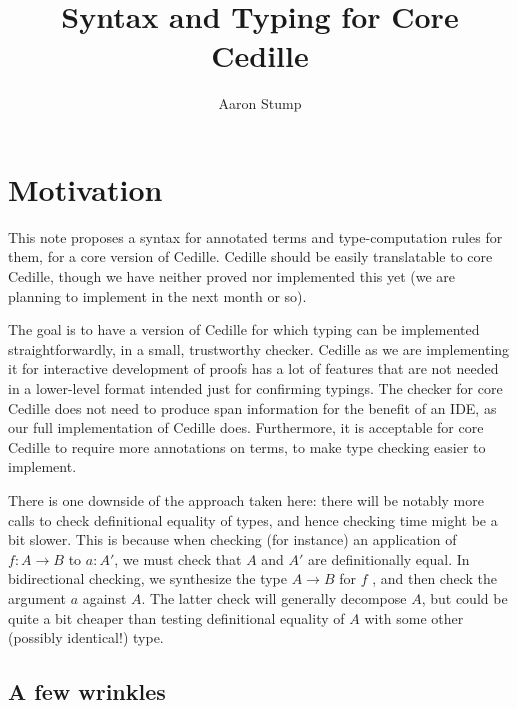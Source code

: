 \documentclass{article}
\begin{document}
\newcommand{\interp}[1]{\llbracket #1 \rrbracket} 
\newtheorem{theorem}{Theorem}
\newtheorem{lemma}[theorem]{Lemma}
\newtheorem{definition}[theorem]{Definition}
\newtheorem{corollary}[theorem]{Corollary}

\title{Syntax and Typing for Core Cedille}

\author{Aaron Stump}

\maketitle

\section{Motivation}

This note proposes a syntax for annotated terms and type-computation
rules for them, for a core version of Cedille.  Cedille should be
easily translatable to core Cedille, though we have neither proved nor
implemented this yet (we are planning to implement in the next
month or so).

The goal is to have a version of Cedille for which typing can be
implemented straightforwardly, in a small, trustworthy checker.
Cedille as we are implementing it for interactive development of
proofs has a lot of features that are not needed in a lower-level
format intended just for confirming typings.  The checker for core
Cedille does not need to produce span information for the benefit of
an IDE, as our full implementation of Cedille does.  Furthermore, it
is acceptable for core Cedille to require more annotations on terms,
to make type checking easier to implement.

There is one downside of the approach taken here: there will be
notably more calls to check definitional equality of types, and hence
checking time might be a bit slower.  This is because when checking
(for instance) an application of $f : A \to B$ to $a : A'$, we must
check that $A$ and $A'$ are definitionally equal.  In bidirectional
checking, we synthesize the type $A \to B$ for $f$ , and then check
the argument $a$ against $A$.  The latter check will generally
decompose $A$, but could be quite a bit cheaper than testing
definitional equality of $A$ with some other (possibly identical!)
type.

\subsection{A few wrinkles}
\end{document}
